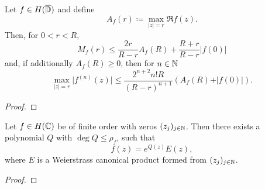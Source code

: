 \begin{lemma} \label{lem:borel-caratheodory}
    Let $f \in H(\overline{\mathbb{D}})$ and define
    $$ A_f(r) \coloneqq \max_{\vert z \vert = r} \Re f(z). $$
    Then, for $0 < r < R$,
    $$ M_f(r) \leq \frac{2r}{R - r} A_f(R) + \frac{R + r}{R - r} \vert f(0) \vert $$
    and, if additionally $A_f(R) \geq 0$, then for $n \in \mathbb{N}$
    $$ \max_{\vert z \vert = r} \vert f^{(n)}(z) \vert \leq \frac{2^{n+2} n! R}{(R - r)^{n+1}} (A_f(R) + \vert f(0) \vert). $$
\end{lemma}

\begin{proof}
\end{proof}

\begin{theorem}[Hadamard] \label{thm:hadamard}
    Let $f \in H(\mathbb{C})$ be of finite order with zeros $(z_j)_{j \in \mathbb{N}}$. Then there exists a polynomial $Q$ with $\deg Q \leq \rho_f$, such that
    $$ f(z) = e^{Q(z)} E(z), $$
    where $E$ is a Weierstrass canonical product formed from $(z_j)_{j \in \mathbb{N}}$.
\end{theorem}

\begin{proof}
\end{proof}